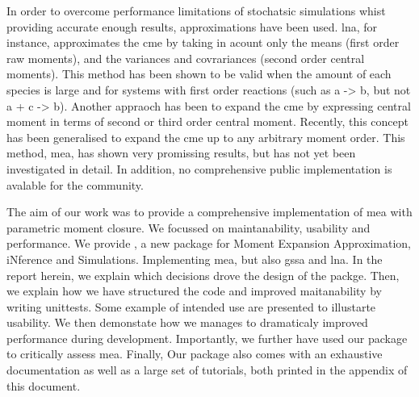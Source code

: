 In order to overcome performance limitations of stochatsic simulations whist providing accurate enough results, approximations have been used.
\Gls{lna}, for instance, approximates the 
\gls{cme}
by taking in acount only the means (first order raw moments), and the variances and covrariances (second order central moments).
This method has been shown to be valid when the amount of each species is large and for systems with first order reactions (such as  a -> b, but not a + c  -> b).
Another appraoch has been to expand the \gls{cme} by expressing central moment in terms of second or third order central moment.
Recently, this concept has been generalised to expand the \gls{cme} up to any arbitrary moment order.
\cite{ale_general_2013}
This method, \gls{mea}, has shown very promissing results, but has not yet been investigated in detail. 
In addition, no comprehensive public implementation is avalable for the community. 




The aim of our work was to provide a comprehensive implementation of \gls{mea} with parametric moment closure. 
We focussed on maintanability, usability and performance. 
We provide \means, a new \py{} package for Moment Expansion Approximation, iNference and Simulations.
Implementing \gls{mea}, but also \gls{gssa} and \gls{lna}. 
In the report herein, we explain which decisions drove the design of the packge. 
Then, we explain how we have structured the code and improved maitanability by writing unittests.
Some example of intended use are presented to illustarte usability.
We then demonstate how we manages to dramaticaly improved performance during development.
Importantly, we further have used our package to critically assess \gls{mea}.
Finally, Our package also comes with an exhaustive documentation as well as a large set of tutorials, both printed in the appendix of this document.
